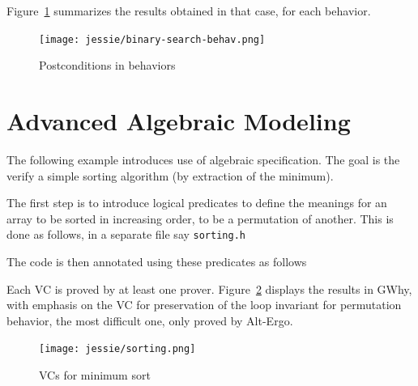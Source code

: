 \documentclass[a4paper,11pt,twoside,openright]{report}
\newcommand{\negtenthspace}{\hspace*{-0.1\linewidth}}
\begin{document}


Figure~\ref{fig:behav} summarizes the results obtained in that case,
for each behavior.

\begin{figure}[t]
  \begin{center}
    \negtenthspace\texttt{[image: jessie/binary-search-behav.png]}
  \end{center}
  \caption{Postconditions in behaviors}
  \label{fig:behav}
  \hrulefill
\end{figure}

\section{Advanced Algebraic Modeling}

The following example introduces use of algebraic specification. The
goal is the verify a simple sorting algorithm (by extraction of the
minimum).

The first step is to introduce logical predicates to define the
meanings for an array to be sorted in increasing order, to be a
permutation of another. This is done as follows, in a separate file
say \texttt{sorting.h}



The code is then annotated using these predicates as follows



Each VC is proved by at least one prover. Figure~\ref{fig:sorting}
displays the results in GWhy, with emphasis on the VC for preservation
of the loop invariant for permutation behavior, the most
difficult one, only proved by Alt-Ergo.

\begin{figure}[t]
  \begin{center}
    \negtenthspace\texttt{[image: jessie/sorting.png]}
  \end{center}
  \caption{VCs for minimum sort}
  \label{fig:sorting}
  \hrulefill
\end{figure}



\end{document}
